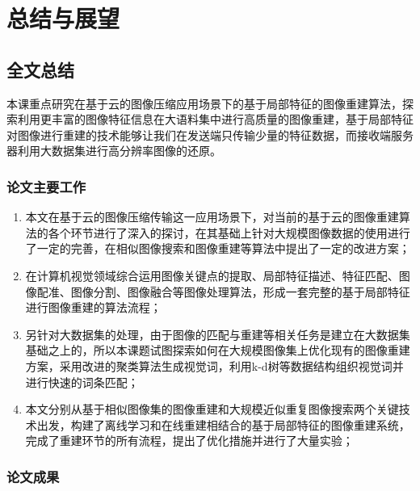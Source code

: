 
\chapter{总结与展望}

\section{全文总结}

本课重点研究在基于云的图像压缩应用场景下的基于局部特征的图像重建算法，探索利用更丰富的图像特征信息在大语料集中进行高质量的图像重建，基于局部特征对图像进行重建的技术能够让我们在发送端只传输少量的特征数据，而接收端服务器利用大数据集进行高分辨率图像的还原。

\subsection{论文主要工作}

\begin{enumerate}
\item 本文在基于云的图像压缩传输这一应用场景下，对当前的基于云的图像重建算法的各个环节进行了深入的探讨，在其基础上针对大规模图像数据的使用进行了一定的完善，在相似图像搜索和图像重建等算法中提出了一定的改进方案；
\item 在计算机视觉领域综合运用图像关键点的提取、局部特征描述、特征匹配、图像配准、图像分割、图像融合等图像处理算法，形成一套完整的基于局部特征进行图像重建的算法流程；
\item 另针对大数据集的处理，由于图像的匹配与重建等相关任务是建立在大数据集基础之上的，所以本课题试图探索如何在大规模图像集上优化现有的图像重建方案，采用改进的聚类算法生成视觉词，利用k-d树等数据结构组织视觉词并进行快速的词条匹配；
\item 本文分别从基于相似图像集的图像重建和大规模近似重复图像搜索两个关键技术出发，构建了离线学习和在线重建相结合的基于局部特征的图像重建系统，完成了重建环节的所有流程，提出了优化措施并进行了大量实验；
\end{enumerate}


\subsection{论文成果}

